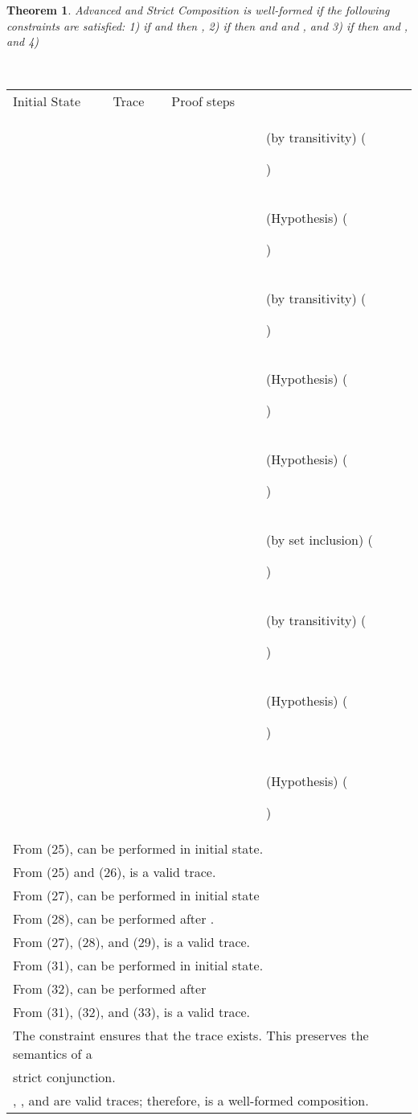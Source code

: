 \documentclass[12pt,journal,letterpaper,onecolumn]{IEEEtran}
\newcounter{myCounter}
\renewcommand{\themyCounter}{\arabic{myCounter}\addtocounter{myCounter}{1}}
\newtheorem{theorem}{Theorem}[section]
\begin{document}
\begin{theorem}
Advanced and Strict Composition  is well-formed if the following constraints
are satisfied: 1) if  and  then
 ,
2) if  then
   and  and , and
3) if  then
  and , and 4) \\
\label{theorem:advancedstrict} \end{theorem}
\\
\begin{minipage}{6in} \begin{center}
\begin{tabular}{llp{7.5cm}p{3.8cm}}
Initial State & Trace &  Proof steps & \\

 &  &
   &
(by transitivity) \hfill(\themyCounter)  \\

& &  & (Hypothesis) \hfill(\themyCounter)  \\


 &  &
   & (by transitivity) \hfill(\themyCounter) \\

& &  & (Hypothesis)  \hfill(\themyCounter)\\

& &  & (Hypothesis)  \hfill(\themyCounter)\\

&  &  &  (by set inclusion)  \hfill(\themyCounter)\\

& &    &   (by transitivity) \hfill(\themyCounter)\\

& & & (Hypothesis)  \hfill(\themyCounter)  \\

& &  & (Hypothesis)  \hfill(\themyCounter) \\

\multicolumn{4}{l}{From (25),  can be performed in initial state.}\\
\multicolumn{4}{l}{From (25) and (26),  is a valid trace.}\\
\multicolumn{4}{l}{From (27),  can be performed in initial state}\\
\multicolumn{4}{l}{From (28),  can be performed after . }\\
\multicolumn{4}{l}{From (27), (28), and (29),  is a valid trace.}\\
\multicolumn{4}{l}{From (31),  can be performed in initial state.}\\
\multicolumn{4}{l}{From (32),  can be performed after }\\
\multicolumn{4}{l}{From (31), (32), and (33),  is a valid trace.}\\
\multicolumn{4}{l}{The constraint  ensures that the trace  exists. This preserves the semantics of a}\\
\multicolumn{4}{l}{strict conjunction.}\\
\multicolumn{4}{l}{, , and  are valid traces;
therefore,  is a well-formed
composition.}\hfill
\end{tabular}
\end{center}
\end{minipage}\\
\end{document}
